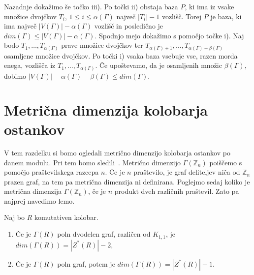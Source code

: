 \documentclass[mat1, tisk]{fmfdelo}
\newcommand{\Z}{\mathbb Z}
\begin{document}
\begin{dokaz}
  Nazadnje dokažimo še točko iii). Po točki ii) obstaja baza $P$, ki ima iz vsake 
  množice dvojčkov $T_i$, $1 \leq i \leq \alpha(\Gamma)$ največ $|T_i| - 1$ vozlišč. 
  Torej $P$ je baza, ki ima največ $|V(\Gamma)| - \alpha(\Gamma)$ vozlišč in 
  posledično je $dim(\Gamma) \leq |V(\Gamma)| - \alpha(\Gamma)$. Spodnjo mejo dokažimo s 
  pomočjo točke i). Naj bodo $T_1, \ldots, T_{\alpha(\Gamma)}$ prave množice dvojčkov ter 
  $T_{\alpha(\Gamma)+1}, \ldots, T_{\alpha(\Gamma)+\beta(\Gamma)}$ osamljene množice dvojčkov. 
  Po točki i) vsaka baza vsebuje vse, razen morda enega, vozlišča iz 
  $T_1, \ldots, T_{\alpha(\Gamma)}$. Če upoštevamo, da je osamljenih množic $\beta(\Gamma)$, 
  dobimo $|V(\Gamma)| - \alpha(\Gamma) - \beta(\Gamma) \leq dim(\Gamma)$.
\end{dokaz}
%
%
%
\section{Metrična dimenzija kolobarja ostankov}
V tem razdelku si bomo ogledali metrično dimenzijo kolobarja ostankov po danem modulu. 
Pri tem bomo sledili~\cite{3pirzada14}. Metrično dimenzijo $\Gamma(\Z_{n})$ poiščemo 
s pomočjo praštevilskega razcepa $n$. Če je $n$ praštevilo, je graf deliteljev 
niča od $\Z_{n}$ prazen graf, na tem pa metrična dimenzija ni definirana. Poglejmo sedaj 
koliko je metrična dimenzija $\Gamma(\Z_{n})$, če je $n$ produkt dveh različnih praštevil. 
Zato pa najprej navedimo lemo.
%
\begin{lema}\label{lema3.1}
  Naj bo $R$ komutativen kolobar.
  \begin{enumerate}[label=({\alph*})]
    \item Če je $\Gamma(R)$ poln dvodelen graf, različen od $K_{1,1}$, je $dim(\Gamma(R)) = |Z^*(R)| - 2$,
    \item Če je $\Gamma(R)$ poln graf, potem je $dim(\Gamma(R)) = |Z^*(R)| - 1$.
    \end{enumerate}
\end{lema}
\end{document}
